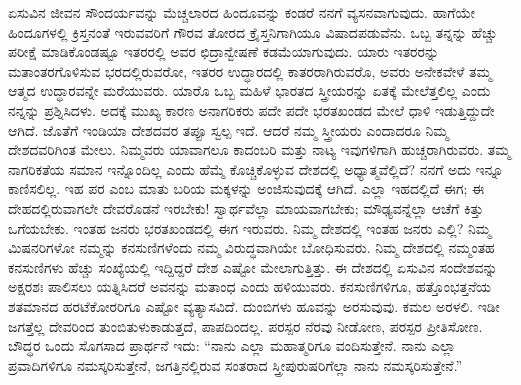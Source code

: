\vskip 4pt

ಏಸುವಿನ ಜೀವನ ಸೌಂದರ್ಯವನ್ನು ಮೆಚ್ಚಲಾರದ ಹಿಂದೂವನ್ನು ಕಂಡರೆ ನನಗೆ ವ್ಯಸನವಾಗುವುದು. ಹಾಗೆಯೇ ಹಿಂದೂಗಳಲ್ಲಿ ಕ್ರಿಸ್ತನಂತೆ ಇರುವವರಿಗೆ ಗೌರವ ತೋರದ ಕ್ರೈಸ್ತನಿಗಾಗಿಯೂ ವಿಷಾದಪಡುವೆನು. ಒಬ್ಬ ತನ್ನನ್ನು ಹೆಚ್ಚು ಪರೀಕ್ಷೆ ಮಾಡಿಕೊಂಡಷ್ಟೂ ಇತರರಲ್ಲಿ ಅವರ ಛಿದ್ರಾನ್ವೇಷಣೆ ಕಡಮೆಯಾಗುವುದು. ಯಾರು ಇತರರನ್ನು ಮತಾಂತರಗೊಳಿಸುವ ಭರದಲ್ಲಿರುವರೋ, ಇತರರ ಉದ್ಧಾರದಲ್ಲಿ ಕಾತರರಾಗಿರುವರೊ, ಅವರು ಅನೇಕವೇಳೆ ತಮ್ಮ ಆತ್ಮದ ಉದ್ಧಾರವನ್ನೇ ಮರೆಯುವರು. ಯಾರೊ ಒಬ್ಬ ಮಹಿಳೆ ಭಾರತದ ಸ್ತ್ರೀಯರನ್ನು ಏತಕ್ಕೆ ಮೇಲೆತ್ತಲಿಲ್ಲ ಎಂದು ನನ್ನನ್ನು ಪ್ರಶ್ನಿಸಿದಳು. ಅದಕ್ಕೆ ಮುಖ್ಯ ಕಾರಣ ಅನಾಗರಿಕರು ಪದೇ ಪದೇ ಭರತಖಂಡದ ಮೇಲೆ ಧಾಳಿ ಇಡುತ್ತಿದ್ದುದೇ ಆಗಿದೆ. ಜೊತೆಗೆ ಇಂಡಿಯಾ ದೇಶದವರ ತಪ್ಪೂ ಸ್ವಲ್ಪ ಇದೆ. ಆದರೆ ನಮ್ಮ ಸ್ತ್ರೀಯರು ಎಂದಾದರೂ ನಿಮ್ಮ ದೇಶದವರಿಗಿಂತ ಮೇಲು. ನಿಮ್ಮವರು ಯಾವಾಗಲೂ ಕಾದಂಬರಿ ಮತ್ತು ನಾಟ್ಯ ಇವುಗಳಿಗಾಗಿ ಹುಚ್ಚರಾಗಿರುವರು. ತಮ್ಮ ನಾಗರಿಕತೆಯ ಸಮಾನ ಇನ್ನೊಂದಿಲ್ಲ ಎಂದು ಹೆಮ್ಮೆ ಕೊಚ್ಚಿಕೊಳ್ಳುವ ದೇಶದಲ್ಲಿ ಅಧ್ಯಾತ್ಮವೆಲ್ಲಿದೆ? ನನಗೆ ಅದು ಇನ್ನೂ ಕಾಣಿಸಲಿಲ್ಲ. ಇಹ ಪರ ಎಂಬ ಮಾತು ಬರಿಯ ಮಕ್ಕಳನ್ನು ಅಂಜಿಸುವುದಕ್ಕೆ ಆಗಿದೆ. ಎಲ್ಲಾ ಇಹದಲ್ಲಿದೆ ಈಗ; ಈ ದೇಹದಲ್ಲಿರುವಾಗಲೇ ದೇವರೊಡನೆ ಇರಬೇಕು! ಸ್ವಾರ್ಥವೆಲ್ಲಾ ಮಾಯವಾಗಬೇಕು; ಮೌಢ್ಯವನ್ನೆಲ್ಲಾ ಆಚೆಗೆ ಕಿತ್ತು ಒಗೆಯಬೇಕು. ಇಂತಹ ಜನರು ಭರತಖಂಡದಲ್ಲಿ ಈಗ ಇರುವರು. ನಿಮ್ಮ ದೇಶದಲ್ಲಿ ಇಂತಹ ಜನರು ಎಲ್ಲಿ? ನಿಮ್ಮ ಮಿಷನರಿಗಳೋ ನಮ್ಮನ್ನು ಕನಸುಣಿಗಳೆಂದು ನಮ್ಮ ವಿರುದ್ಧವಾಗಿಯೇ ಬೋಧಿಸುವರು. ನಿಮ್ಮ ದೇಶದಲ್ಲಿ ನಮ್ಮಂತಹ ಕನಸುಣಿಗಳು ಹೆಚ್ಚು ಸಂಖ್ಯೆಯಲ್ಲಿ ಇದ್ದಿದ್ದರೆ ದೇಶ ಎಷ್ಟೋ ಮೇಲಾಗುತ್ತಿತ್ತು. ಈ ದೇಶದಲ್ಲಿ ಏಸುವಿನ ಸಂದೇಶವನ್ನು ಅಕ್ಷರಶಃ ಪಾಲಿಸಲು ಯತ್ನಿಸಿದರೆ ಅವನನ್ನು ಮತಾಂಧ ಎಂದು ಹಳಿಯುವರು. ಕನಸುಣಿಗಳಿಗೂ, ಹತ್ತೊಂಭತ್ತನೆಯ ಶತಮಾನದ ಹರಟೆಕೋರರಿಗೂ ಎಷ್ಟೋ ವ್ಯತ್ಯಾಸವಿದೆ. ದುಂಬಿಗಳು ಹೂವನ್ನು ಅರಸುವುವು. ಕಮಲ ಅರಳಲಿ. ಇಡೀ ಜಗತ್ತೆಲ್ಲ ದೇವರಿಂದ ತುಂಬಿತುಳುಕಾಡುತ್ತದೆ, ಪಾಪದಿಂದಲ್ಲ. ಪರಸ್ಪರ ನೆರವು ನೀಡೋಣ, ಪರಸ್ಪರ ಪ್ರೀತಿಸೋಣ. ಬೌದ್ಧರ ಒಂದು ಸೊಗಸಾದ ಪ್ರಾರ್ಥನೆ ಇದು: “ನಾನು ಎಲ್ಲಾ ಮಹಾತ್ಮರಿಗೂ ವಂದಿಸುತ್ತೇನೆ. ನಾನು ಎಲ್ಲಾ ಪ್ರವಾದಿಗಳಿಗೂ ನಮಸ್ಕರಿಸುತ್ತೇನೆ, ಜಗತ್ತಿನಲ್ಲಿರುವ ಸಂತರಾದ ಸ್ತ್ರೀಪುರುಷರಿಗೆಲ್ಲಾ ನಾನು ನಮಸ್ಕರಿಸುತ್ತೇನೆ.”

